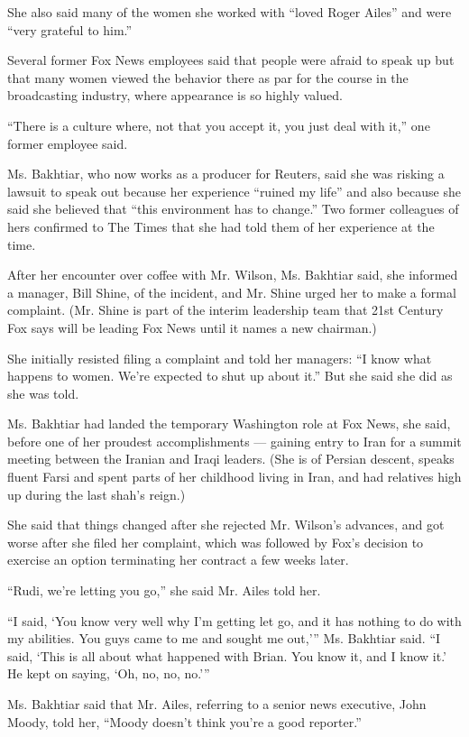 She also said many of the women she worked with ``loved Roger Ailes''
and were ``very grateful to him.''

Several former Fox News employees said that people were afraid to speak
up but that many women viewed the behavior there as par for the course
in the broadcasting industry, where appearance is so highly valued.

``There is a culture where, not that you accept it, you just deal with
it,'' one former employee said.

Ms. Bakhtiar, who now works as a producer for Reuters, said she was
risking a lawsuit to speak out because her experience ``ruined my life''
and also because she said she believed that ``this environment has to
change.'' Two former colleagues of hers confirmed to The Times that she
had told them of her experience at the time.

After her encounter over coffee with Mr. Wilson, Ms. Bakhtiar said, she
informed a manager, Bill Shine, of the incident, and Mr. Shine urged her
to make a formal complaint. (Mr. Shine is part of the interim leadership
team that 21st Century Fox says will be leading Fox News until it names
a new chairman.)

She initially resisted filing a complaint and told her managers: ``I
know what happens to women. We're expected to shut up about it.'' But
she said she did as she was told.

Ms. Bakhtiar had landed the temporary Washington role at Fox News, she
said, before one of her proudest accomplishments --- gaining entry to
Iran for a summit meeting between the Iranian and Iraqi leaders. (She is
of Persian descent, speaks fluent Farsi and spent parts of her childhood
living in Iran, and had relatives high up during the last shah's reign.)

She said that things changed after she rejected Mr. Wilson's advances,
and got worse after she filed her complaint, which was followed by Fox's
decision to exercise an option terminating her contract a few weeks
later.

``Rudi, we're letting you go,'' she said Mr. Ailes told her.

``I said, `You know very well why I'm getting let go, and it has nothing
to do with my abilities. You guys came to me and sought me out,''' Ms.
Bakhtiar said. ``I said, `This is all about what happened with Brian.
You know it, and I know it.' He kept on saying, `Oh, no, no, no.'''

Ms. Bakhtiar said that Mr. Ailes, referring to a senior news executive,
John Moody, told her, ``Moody doesn't think you're a good reporter.''

